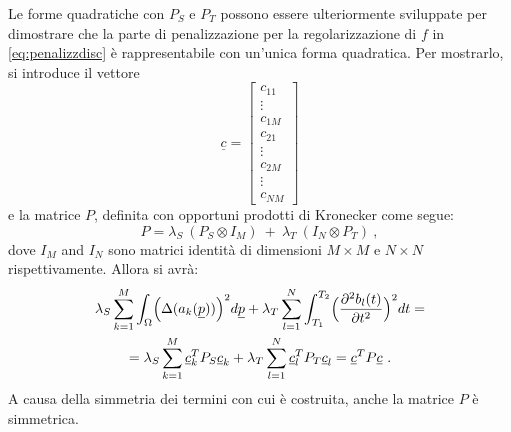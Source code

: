 \documentclass[a4paper,11pt,twoside,openright]{book}							%
\begin{document}
Le forme quadratiche con $P_S$ e $P_T$ possono essere ulteriormente sviluppate per dimostrare che la parte di penalizzazione per la regolarizzazione di $f$ in \ref{eq:penalizzdisc} è rappresentabile con un'unica forma quadratica. Per mostrarlo, si introduce il vettore
$$\underline c =
\begin{bmatrix}
c_{11}  \\
\vdots\\
c_{1M}  \\
c_{21}  \\
\vdots\\
c_{2M}  \\
\vdots\\
c_{NM}
\end{bmatrix}
$$
e la matrice $P$, definita con opportuni prodotti di Kronecker come segue:
$$
P = \lambda_S\    (P_S \otimes I_M)   \ +\  \lambda_T\   (I_N \otimes P_T) \ ,
$$
dove $I_M$ and $I_N$ sono matrici identità di dimensioni $M \times M$ e $N \times N$ rispettivamente. Allora si avrà:
\begin{multline}
\lambda_S  \sum_{k=1}^M \int_{\Omega} \Bigl( \Delta(  a_k(\underline p)  ) \Bigr)^2 d \underline p + \lambda_T \sum_{l=1}^N\int_{T_1}^{T_2} \Bigl( \frac{\partial^2   b_l(t)   }{\partial t ^2} \Bigr)^2 dt =
\\ = \lambda_S\sum_{k=1}^M\underline{c}_k^T P_S \underline{c}_k + \lambda_T\sum_{l=1}^N\underline{c}_l^T P_T \underline{c}_l = \underline{c}^T P \underline{c} \ .
\end{multline}
A causa della simmetria dei termini con cui è costruita, anche la matrice $P$ è simmetrica.
\end{document}
